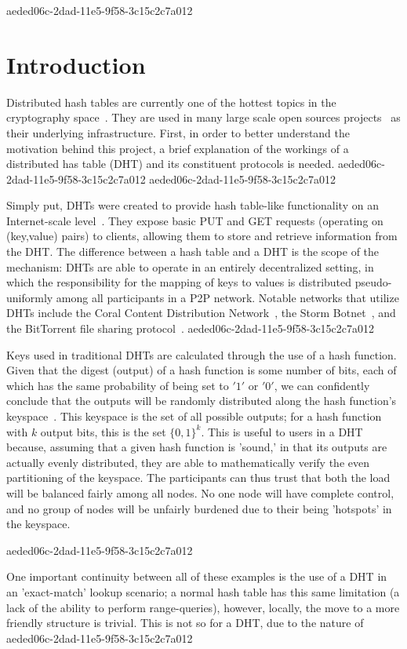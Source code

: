\documentclass[12pt]{article}
\begin{document}
aeded06c-2dad-11e5-9f58-3c15c2c7a012\section{Introduction}
\par Distributed hash tables are currently one of the hottest topics in the cryptography space~\cite{Stoica:2001dj,Rowstron:2001ea,Ratnasamy:2001wn}. They are used in many large scale open sources projects~\cite{Freitas:2013tb,Xu:2010vs,Perfitt:2010fh} as their underlying infrastructure. First, in order to better understand the motivation behind this project, a brief explanation of the workings of a distributed has table (DHT) and its constituent protocols is needed.
aeded06c-2dad-11e5-9f58-3c15c2c7a012
aeded06c-2dad-11e5-9f58-3c15c2c7a012\par Simply put, DHTs were created to provide hash table-like functionality on an Internet-scale level~\cite{Ratnasamy:2001wn}. They expose basic PUT and GET requests (operating on (key,value) pairs) to clients, allowing them to store and retrieve information from the DHT. The difference between a hash table and a DHT is the scope of the mechanism: DHTs are able to operate in an entirely decentralized setting, in which the responsibility for the mapping of keys to values is distributed pseudo-uniformly among all participants in a P2P network. Notable networks that utilize DHTs include the Coral Content Distribution Network~\cite{Freedman:2004vb}, the Storm Botnet~\cite{Holz:2008uk}, and the BitTorrent file sharing protocol~\cite{Cohen:y1_8mBnw}.
aeded06c-2dad-11e5-9f58-3c15c2c7a012
\par Keys used in traditional DHTs are calculated through the use of a hash function. Given that the digest (output) of a hash function is some number of bits, each of which has the same probability of being set to $'1'$ or $'0'$, we can confidently conclude that the outputs will be randomly distributed along the hash function's keyspace~. This keyspace is the set of all possible outputs; for a hash function with $k$ output bits, this is the set $\{0,1\}^k$. This is useful to users in a DHT because, assuming that a given hash function is 'sound,' in that its outputs are actually evenly distributed, they are able to mathematically verify the even partitioning of the keyspace. The participants can thus trust that both the load will be balanced fairly among all nodes. No one node will have complete control, and no group of nodes will be unfairly burdened due to their being 'hotspots' in the keyspace.~

aeded06c-2dad-11e5-9f58-3c15c2c7a012\par One important continuity between all of these examples is the use of a DHT in an 'exact-match' lookup scenario; a normal hash table has this same limitation (a lack of the ability to perform range-queries), however, locally, the move to a more friendly structure is trivial. This is not so for a DHT, due to the nature of
aeded06c-2dad-11e5-9f58-3c15c2c7a012\printbibliography
\end{document}
